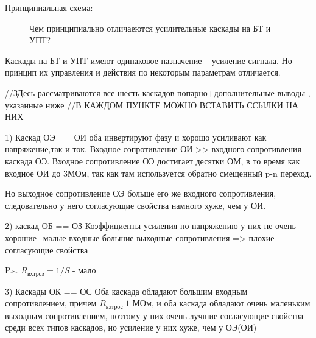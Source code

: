 \documentclass[12pt,a4paper]{article}
\begin{document}
Принципиальная схема:
\begin{center}
        \begin{figure}[h!]
                \caption{Чем принципиально отличаеются усилительные каскады на БТ и УПТ?}
        \end{figure}
\end{center}
Каскады на БТ и УПТ имеют одинаковое назначение -- усиление сигнала. Но принцип их управления и действия по некоторым параметрам отличается.

//ЗДесь рассматриваются все шесть каскадов попарно+дополнительные выводы , указанные ниже  //В КАЖДОМ ПУНКТЕ МОЖНО ВСТАВИТЬ ССЫЛКИ НА НИХ 

1) Каскад ОЭ == ОИ
оба инвертируют фазу и хорошо усиливают как напряжение,так и ток.
Входное сопротивление ОИ >> входного сопротивления каскада ОЭ.
Входное сопротивление ОЭ достигает десятки ОМ, в то время как входное ОИ до 3МОм, так как там используется обратно смещенный p-n переход.

Но выходное сопротивление ОЭ больше его же входного сопротивления, следовательно у него согласующие свойства намного хуже, чем у ОИ.


2) каскад ОБ == ОЗ
Коэффициенты усиления по напряжению у них не очень хорошие+малые входные  большие выходные сопротивления => плохие согласующие свойства

P.s. $R_\textit{вхтроз} = 1/S$ - мало

3) Каскады ОК == ОС
Оба каскада обладают большим входным сопротивлением, причем $R_\textit{вхтрос} ~ 1$ МОм, и оба каскада обладают очень маленьким выходным сопротивлением, поэтому у них очень лучшие согласующие свойства среди всех типов каскадов, но усиление у них хуже, чем у ОЭ(ОИ)
\end{document}
